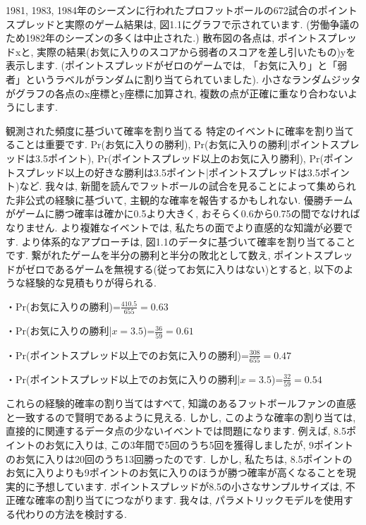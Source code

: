 \documentclass[10pt,dvipdfmx,a4]{beamer}
\begin{document}

\begin{frame}
1981, 1983, 1984年のシーズンに行われたプロフットボールの672試合のポイントスプレッドと実際のゲーム結果は, 図1.1にグラフで示されています.
(労働争議のため1982年のシーズンの多くは中止された.)
散布図の各点は, ポイントスプレッドxと, 実際の結果(お気に入りのスコアから弱者のスコアを差し引いたもの)yを表示します.
(ポイントスプレッドがゼロのゲームでは, 「お気に入り」と「弱者」というラベルがランダムに割り当てられていました).
小さなランダムジッタがグラフの各点のx座標とy座標に加算され, 複数の点が正確に重なり合わないようにします.
\end{frame}


\begin{frame}{観測された頻度に基づいて確率を割り当てる}
特定のイベントに確率を割り当てることは重要です.
$\text{Pr}$(お気に入りの勝利), $\text{Pr}$(お気に入りの勝利|ポイントスプレッドは3.5ポイント), $\text{Pr}$(ポイントスプレッド以上のお気に入り勝利), $\text{Pr}$(ポイントスプレッド以上の好きな勝利は3.5ポイント|ポイントスプレッドは3.5ポイント)など.
我々は, 新聞を読んでフットボールの試合を見ることによって集められた非公式の経験に基づいて, 主観的な確率を報告するかもしれない.
優勝チームがゲームに勝つ確率は確かに0.5より大きく, おそらく0.6から0.75の間でなければなりません.
より複雑なイベントでは, 私たちの面でより直感的な知識が必要です.
より体系的なアプローチは, 図1.1のデータに基づいて確率を割り当てることです.
繋がれたゲームを半分の勝利と半分の敗北として数え, ポイントスプレッドがゼロであるゲームを無視する(従ってお気に入りはない)とすると, 以下のような経験的な見積もりが得られる.

・$\text{Pr}$(お気に入りの勝利)=$\tfrac{410.5}{655}=0.63$

・$\text{Pr}$(お気に入りの勝利|$x=3.5$)=$\tfrac{36}{59}=0.61$

・$\text{Pr}$(ポイントスプレッド以上でのお気に入りの勝利)=$\tfrac{308}{655}=0.47$

・$\text{Pr}$(ポイントスプレッド以上でのお気に入りの勝利|$x=3.5$)=$\tfrac{32}{59}=0.54$
\end{frame}


\begin{frame}
これらの経験的確率の割り当てはすべて, 知識のあるフットボールファンの直感と一致するので賢明であるように見える.
しかし, このような確率の割り当ては, 直接的に関連するデータ点の少ないイベントでは問題になります.
例えば, 8.5ポイントのお気に入りは, この3年間で5回のうち5回を獲得しましたが, 9ポイントのお気に入りは20回のうち13回勝ったのです.
しかし, 私たちは, 8.5ポイントのお気に入りよりも9ポイントのお気に入りのほうが勝つ確率が高くなることを現実的に予想しています.
ポイントスプレッドが8.5の小さなサンプルサイズは, 不正確な確率の割り当てにつながります.
我々は, パラメトリックモデルを使用する代わりの方法を検討する.
\end{frame}
\end{document}
